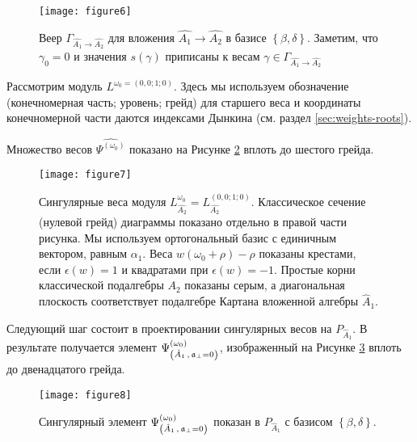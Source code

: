 \begin{figure}[h!bt]
  \centering
  \texttt{[image: figure6]}

  \caption{Веер  $\Gamma_{\hat{A_1}\rightarrow \hat{A_2}}$ для вложения $\hat{A_1}\rightarrow \hat{A_2}$ в базисе $\left\{\beta,\delta \right\}$. Заметим, что  $\gamma_0 =0$ и значения $s(\gamma)$ приписаны к весам $\gamma\in \Gamma_{\hat{A_1}\rightarrow \hat{A_2}}$}
  \label{fig:AffineA2A1Fan}
\end{figure}

Рассмотрим модуль $L^{\omega_0=(0,0;1;0)}$. Здесь мы используем обозначение (конечномерная часть; уровень; грейд)
для старшего веса и координаты конечномерной части даются индексами Дынкина (см. раздел \ref{sec:weights-roots}).

Множество весов $\widehat{\Psi^{(\omega_0)}}$ показано на Рисунке \ref{fig:affine_A2_anom_point} вплоть до шестого грейда.

\begin{figure}[h!tb]
  \hspace*{-1.5cm}
  \texttt{[image: figure7]}
  \caption{Сингулярные веса модуля $L_{\hat{A_2}}^{\omega_0}=L^{(0,0;1;0)}_{\hat{A_2}}$. Классическое сечение (нулевой грейд) диаграммы показано отдельно в правой части рисунка. 
    Мы используем ортогональный базис с единичным вектором, равным $\alpha_1$. Веса $w (\omega_0+\rho)-\rho$ показаны крестами, если $\epsilon(w)=1$ и квадратами при $\epsilon(w)=-1$. Простые корни классической подалгебры  $A_2$ показаны серым, а диагональная плоскость соответствует подалгебре Картана вложенной алгебры $\hat{A}_1$.}
  \label{fig:affine_A2_anom_point}
\end{figure}

Следующий шаг состоит в проектировании сингулярных весов на $P_{\hat A_1}$. В результате получается элемент $\Psi ^{\left( \omega_0 \right) }_{\left(  \hat A_1\, , \, \mathfrak{a}_{\perp}=0 \right)}$, изображенный на Рисунке \ref{fig:AffineA2_A1_anom_proj} вплоть до двенадцатого грейда.
\begin{figure}[h!tb]
  \centering
  \texttt{[image: figure8]}
  \caption{Сингулярный элемент $\Psi ^{\left( \omega_0 \right) }_{\left(  \hat A_1\, , \, \mathfrak{a}_{\perp}=0 \right)}$ показан в $P_{\hat A_1}$ с базисом $\left\{\beta,\delta \right\}$.}
  \label{fig:AffineA2_A1_anom_proj}
\end{figure}

